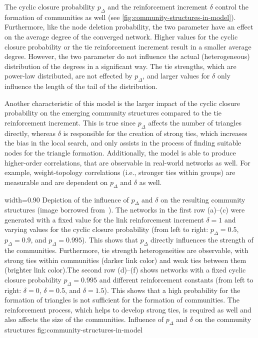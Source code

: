 The cyclic closure probability \( p_{\Delta} \) and the reinforcement increment \( \delta \) control the formation of communities as well (see \cref{fig:community-structures-in-model}).
Furthermore, like the node deletion probability, the two parameter have an effect on the average degree of the converged network.
Higher values for the cyclic closure probability or the tie reinforcement increment result in a smaller average degree.
However, the two parameter do not influence the actual (heterogeneous) distribution of the degrees in a significant way.
The tie strengths, which are power-law distributed, are not effected by \( p_{\Delta} \), and larger values for \( \delta \) only influence the length of the tail of the distribution.

Another characteristic of this model is the larger impact of the cyclic closure probability on the emerging community structures compared to the tie reinforcement increment.
This is true since \( p_{\Delta} \) affects the number of triangles directly, whereas \( \delta \) is responsible for the creation of strong ties, which increases the bias in the local search, and only assists in the process of finding suitable nodes for the triangle formation.
Additionally, the model is able to produce higher-order correlations, that are observable in real-world networks as well.
For example, weight-topology correlations (i.e., stronger ties within groups) are measurable and are dependent on \( p_{\Delta} \) and \( \delta \) as well.


      {width=0.90\textwidth}
      {Depiction of the influence of \( p_{\Delta} \) and \( \delta \) on the resulting community structures (image borrowed from~\cite{Laurent2015}). The networks in the first row (a)--(c) were generated with a fixed value for the link reinforcement increment \(\delta = 1\) and varying values for the cyclic closure probability (from left to right: \( p_{\Delta} = 0.5 \), \( p_{\Delta} = 0.9 \), and \( p_{\Delta} = 0.995 \)). This shows that \( p_{\Delta} \) directly influences the strength of the communities. Furthermore, tie strength heterogeneities are observable, with strong ties within communities (darker link color) and weak ties between them (brighter link color).The second row (d)--(f) shows networks with a fixed cyclic closure probability \( p_{\Delta} = 0.995 \) and different reinforcement constants (from left to right: \(\delta = 0\), \(\delta = 0.5\), and \(\delta = 1.5\)). This shows that a high probability for the formation of triangles is not sufficient for the formation of communities. The reinforcement process, which helps to develop strong ties, is required as well and also affects the size of the communities.}
      {Influence of \( p_{\Delta} \) and \( \delta \) on the community structures}
      {fig:community-structures-in-model}


